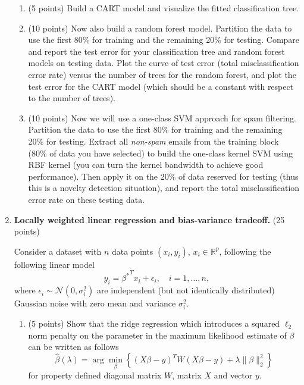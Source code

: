 \documentclass[twoside,10pt]{article}
\begin{document}
\begin{enumerate}
\begin{enumerate}

\item (5 points) Build a CART model and visualize the fitted classification tree.

\item (10 points) Now also build a random forest model. Partition the data to use the first 80\% for training and the remaining 20\% for testing. Compare and report the test error for your classification tree and random forest models on testing data. Plot the curve of test error (total misclassification error rate) versus the number of trees for the random forest, and plot the test error for the CART model (which should be a constant with respect to the number of trees). 

\item (10 points) Now we will use a one-class SVM approach for spam filtering. Partition the data to use the first 80\% for training and the remaining 20\% for testing. Extract all {\it non-spam} emails from the training block (80\% of data you have selected) to build the one-class kernel SVM using RBF kernel (you can turn the kernel bandwidth to achieve good performance). Then apply it on the 20\% of data reserved for testing (thus this is a novelty detection situation), and report the total misclassification error rate on these testing data. 

\end{enumerate}



\clearpage 

\item {\bf Locally weighted linear regression and bias-variance tradeoff.} (25 points)

Consider a dataset with $n$ data points $(x_i, y_i)$, $x_i \in \mathbb R^p$, following the following linear model
\[
y_i = {\beta^*}^T x_i + \epsilon_i, \quad i = 1, \ldots, n,
\]
where $\epsilon_i \sim \mathcal N(0, \sigma_i^2)$ are independent (but not identically distributed) Gaussian noise with zero mean and variance $\sigma_i^2$.

 
\begin{enumerate}

\item (5 points) Show that the ridge regression which introduces a squared $\ell_2$ norm penalty on the parameter in the maximum likelihood estimate of $\beta$ can be written as follows
\[
\hat \beta (\lambda) = \arg \min_{\beta} 
\left\{
(X \beta - y)^T W (X \beta - y) + \lambda \|\beta\|_2^2
\right\}
\]
for property defined diagonal matrix $W$, matrix $X$ and vector $y$. 



\end{enumerate}
\end{enumerate}
\end{document}
